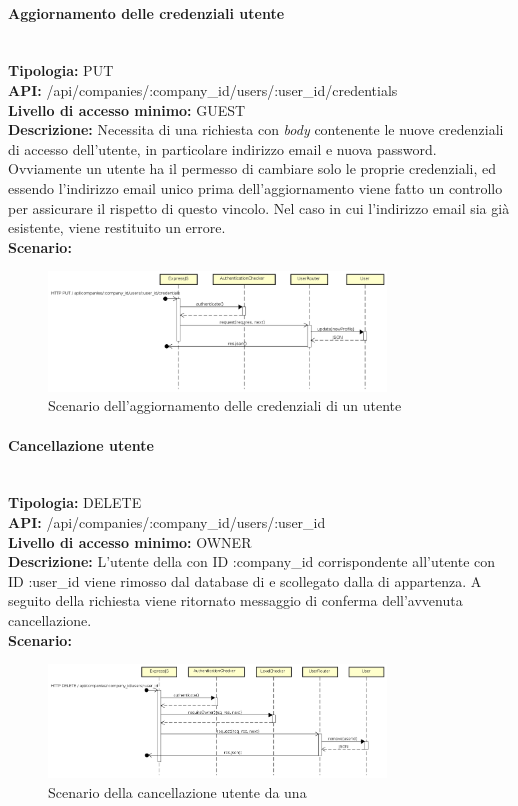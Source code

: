 \paragraph{Aggiornamento delle credenziali utente}\mbox{}\\
\textbf{Tipologia:} PUT \\
\textbf{API:} /api/companies/:company\_id/users/:user\_id/credentials \\
\textbf{Livello di accesso minimo:} GUEST \\
\textbf{Descrizione:} Necessita di una richiesta con \textit{body} contenente le nuove credenziali di accesso dell'utente, in particolare indirizzo email e nuova password. Ovviamente un utente ha il permesso di cambiare solo le proprie credenziali, ed essendo l'indirizzo email unico prima dell'aggiornamento viene fatto un controllo per assicurare il rispetto di questo vincolo. Nel caso in cui l'indirizzo email sia già esistente, viene restituito un errore. \\
\textbf{Scenario:} 
\begin{figure}[H]
\centering
\includegraphics[width=0.8\textwidth]{res/sections/backend/sequence/(PUT)credenzialiUtente.png}
\caption{Scenario dell'aggiornamento delle credenziali di un utente}
\end{figure}

\newpage
\paragraph{Cancellazione utente}\mbox{}\\
\textbf{Tipologia:} DELETE \\
\textbf{API:} /api/companies/:company\_id/users/:user\_id \\
\textbf{Livello di accesso minimo:} OWNER \\
\textbf{Descrizione:} L'utente della  con ID :company\_id corrispondente all'utente con ID :user\_id viene rimosso dal database di  e scollegato dalla  di appartenza. A seguito della richiesta viene ritornato messaggio di conferma dell'avvenuta cancellazione. \\
\textbf{Scenario:} 
\begin{figure}[H]
\centering
\includegraphics[width=0.8\textwidth]{res/sections/backend/sequence/(DELETE)user.png}
\caption{Scenario della cancellazione utente da una }
\end{figure}

